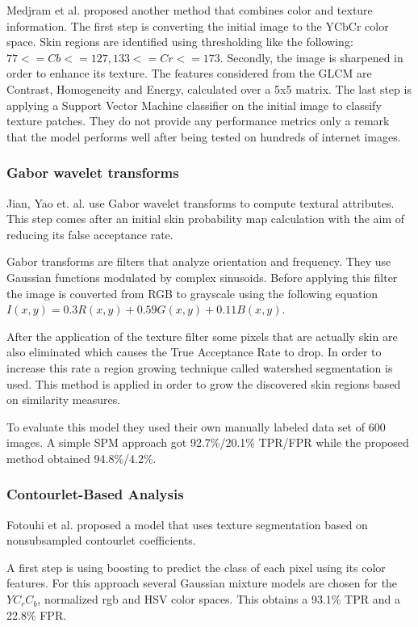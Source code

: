 \documentclass[12pt]{report}
\begin{document}
 	Medjram et al.\cite{texture_svm} proposed another method that combines color and texture information. The first step is converting the initial image to the YCbCr color space. Skin regions are identified using thresholding like the following: \(77 <= Cb <= 127, 133 <= Cr <= 173\). Secondly, the image is sharpened in order to enhance its texture. The features considered from the GLCM are Contrast, Homogeneity and Energy, calculated over a 5x5 matrix. The last step is applying a Support Vector Machine classifier on the initial image to classify texture patches. They do not provide any performance metrics only a remark that the model performs well after being tested on hundreds of internet images.
 	
 	\subsubsection{Gabor wavelet transforms}
 	Jian, Yao et. al. \cite{texture_gabor_wavelet} use Gabor wavelet transforms to compute textural attributes. This step comes after an initial skin probability map calculation with the aim of reducing its false acceptance rate. 
 	
 	Gabor transforms are filters that analyze orientation and frequency. They use Gaussian functions modulated by complex sinusoids. Before applying this filter the image is converted from RGB to grayscale using the following equation $I(x,y)=0.3R(x,y)+0.59G(x,y)+0.11B(x,y)$.
 	
 	After the application of the texture filter some pixels that are actually skin are also eliminated which causes the True Acceptance Rate to drop. In order to increase this rate a region growing technique called watershed segmentation is used. This method is applied in order to grow the discovered skin regions based on similarity measures.
 	
 	To evaluate this model they used their own manually labeled data set of 600 images. A simple SPM approach got 92.7\%/20.1\% TPR/FPR while the proposed method obtained 94.8\%/4.2\%.
 	
 	\subsubsection{Contourlet-Based Analysis}
 	Fotouhi et al. \cite{contourlet_texture} proposed a model that uses texture segmentation based on nonsubsampled contourlet coefficients. 
 	
 	A first step is using boosting to predict the class of each pixel using its color features. For this approach several Gaussian mixture models are chosen for the $YC_rC_b$, normalized rgb and HSV color spaces. This obtains a 93.1\% TPR and a 22.8\% FPR.
 	
\end{document}

